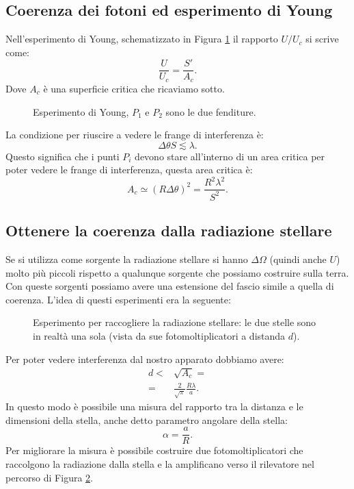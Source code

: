 \subsection{Coerenza dei fotoni ed esperimento di Young}
\label{subsec:Coerenza dei fotoni ed esperimento di Young}
Nell'esperimento di Young, schematizzato in Figura \ref{fig:esperimento-di-young} il rapporto $U /U_c$ si scrive come:
\[
	\frac{U}{U_c} = \frac{S'}{A_c}
.\] 
Dove $A_c$ è una superficie critica che ricaviamo sotto.
\begin{figure}[H]
    \centering
    \caption{Esperimento di Young, $P_1$ e $P_2$ sono le due fenditure.}
    \label{fig:esperimento-di-young}
\end{figure}
\noindent
La condizione per riuscire a vedere le frange di interferenza è:
\[
	\Delta \theta S \lesssim \lambda 
.\] 
Questo significa che i punti $P_i$ devono stare all'interno di un area critica per poter vedere le frange di interferenza, questa area critica è:
\[
	A_c \simeq \left( R \Delta \theta  \right)^2 =
	\frac{R^2 \lambda ^2}{S^2}
.\] 

\subsection{Ottenere la coerenza dalla radiazione stellare}
\label{subsec:Ottenere la coerenza dalla radiazione stellare}
Se si utilizza come sorgente la radiazione stellare si hanno $\Delta \Omega $ (quindi anche $U$) molto più piccoli rispetto a qualunque sorgente che possiamo costruire sulla terra.\\
Con queste sorgenti possiamo avere una estensione del fascio simile a quella di coerenza. L'idea di questi esperimenti era la seguente:
\begin{figure}[H]
    \centering
    \caption{Esperimento per raccogliere la radiazione stellare: le due stelle sono in realtà una sola (vista da sue fotomoltiplicatori a distanda $d$).}
    \label{fig:esperimento-per-raccogliere-la-radiazione-stellare}
\end{figure}
\noindent
Per poter vedere interferenza dal nostro apparato dobbiamo avere:
\[\begin{aligned}
	 d 
	 <&
	 \sqrt{A_c} =\\
	 =& \frac{2}{\sqrt{\pi}}\frac{R\lambda }{a}
.\end{aligned}\]
In questo modo è possibile una misura del rapporto tra la distanza e le dimensioni della stella, anche detto parametro angolare della stella:
\[
	\alpha = \frac{a}{R}
.\] 
Per migliorare la misura è possibile costruire due fotomoltiplicatori che raccolgono la radiazione dalla stella e la amplificano verso il rilevatore nel percorso di Figura \ref{fig:esperimento-per-raccogliere-la-radiazione-stellare}.
